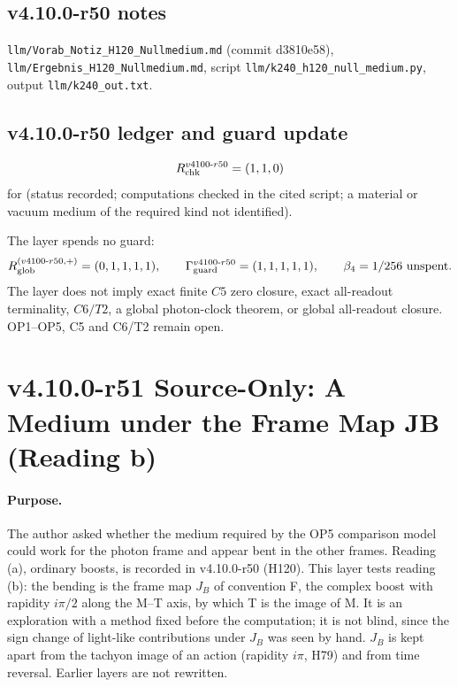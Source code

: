 \subsection*{v4.10.0-r50 notes}
\label{subsec:v4100-r50-notes}

\texttt{llm/\allowbreak Vorab\_\allowbreak Notiz\_\allowbreak H120\_\allowbreak Nullmedium.md} (commit d3810e58), \texttt{llm/\allowbreak Ergebnis\_\allowbreak H120\_\allowbreak Nullmedium.md},
script \texttt{llm/\allowbreak k240\_\allowbreak h120\_\allowbreak null\_\allowbreak medium.py}, output \texttt{llm/\allowbreak k240\_\allowbreak out.txt}.

\subsection*{v4.10.0-r50 ledger and guard update}
\label{subsec:v4100-r50-ledger-guard}

\[
R_{\rm chk}^{v4100\text{-}r50}=(1,1,0)
\]
for (status recorded; computations checked in the cited script; a material or vacuum medium of the required kind not identified).

The layer spends no guard:
\[
R_{\rm glob}^{(v4100\text{-}r50,+)}=(0,1,1,1,1),
\qquad
\Gamma_{\rm guard}^{v4100\text{-}r50}=(1,1,1,1,1),
\qquad
\beta_4=1/256\ \text{unspent}.
\]
The layer does not imply exact finite \(C5\) zero closure, exact all-readout terminality, \(C6/T2\), a global photon-clock theorem,
or global all-readout closure.  OP1--OP5, C5 and C6/T2 remain open.

\clearpage
\section*{v4.10.0-r51 Source-Only: A Medium under the Frame Map JB (Reading b)}
\label{sec:v4100-r51-jb-medium}

\paragraph{Purpose.}
The author asked whether the medium required by the OP5 comparison model could work for the photon frame and appear bent in the other
frames.  Reading (a), ordinary boosts, is recorded in v4.10.0-r50 (H120).  This layer tests reading (b): the bending is the frame map \(J_B\) of
convention F, the complex boost with rapidity \(i\pi/2\) along the M--T axis, by which T is the image of M.  It is an exploration with a method fixed
before the computation; it is not blind, since the sign change of light-like contributions under \(J_B\) was seen by hand.  \(J_B\) is kept apart from the
tachyon image of an action (rapidity \(i\pi\), H79) and from time reversal.  Earlier layers are not rewritten.

